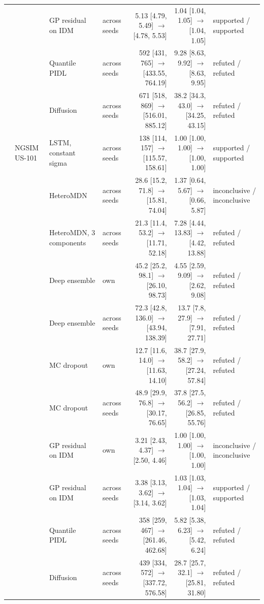 \begin{longtable}{llllrrl}
 &  & GP residual on IDM & across seeds & 5.13 [4.79, 5.49] $\rightarrow$ [4.78, 5.53] & 1.04 [1.04, 1.05] $\rightarrow$ [1.04, 1.05] & supported / supported \\
 &  & Quantile PIDL & across seeds & 592 [431, 765] $\rightarrow$ [433.55, 764.19] & 9.28 [8.63, 9.92] $\rightarrow$ [8.63, 9.95] & refuted / refuted \\
 &  & Diffusion & across seeds & 671 [518, 869] $\rightarrow$ [516.01, 885.12] & 38.2 [34.3, 43.0] $\rightarrow$ [34.25, 43.15] & refuted / refuted \\
\midrule
 & NGSIM US-101 & LSTM, constant sigma & across seeds & 138 [114, 157] $\rightarrow$ [115.57, 158.61] & 1.00 [1.00, 1.00] $\rightarrow$ [1.00, 1.00] & supported / supported \\
 &  & HeteroMDN & across seeds & 28.6 [15.2, 71.8] $\rightarrow$ [15.81, 74.04] & 1.37 [0.64, 5.67] $\rightarrow$ [0.66, 5.87] & inconclusive / inconclusive \\
 &  & HeteroMDN, 3 components & across seeds & 21.3 [11.4, 53.2] $\rightarrow$ [11.71, 52.18] & 7.28 [4.44, 13.83] $\rightarrow$ [4.42, 13.88] & refuted / refuted \\
 &  & Deep ensemble & own & 45.2 [25.2, 98.1] $\rightarrow$ [26.10, 98.73] & 4.55 [2.59, 9.09] $\rightarrow$ [2.62, 9.08] & refuted / refuted \\
 &  & Deep ensemble & across seeds & 72.3 [42.8, 136.0] $\rightarrow$ [43.94, 138.39] & 13.7 [7.8, 27.9] $\rightarrow$ [7.91, 27.71] & refuted / refuted \\
 &  & MC dropout & own & 12.7 [11.6, 14.0] $\rightarrow$ [11.63, 14.10] & 38.7 [27.9, 58.2] $\rightarrow$ [27.24, 57.84] & refuted / refuted \\
 &  & MC dropout & across seeds & 48.9 [29.9, 76.8] $\rightarrow$ [30.17, 76.65] & 37.8 [27.5, 56.2] $\rightarrow$ [26.85, 55.76] & refuted / refuted \\
 &  & GP residual on IDM & own & 3.21 [2.43, 4.37] $\rightarrow$ [2.50, 4.46] & 1.00 [1.00, 1.00] $\rightarrow$ [1.00, 1.00] & inconclusive / inconclusive \\
 &  & GP residual on IDM & across seeds & 3.38 [3.13, 3.62] $\rightarrow$ [3.14, 3.62] & 1.03 [1.03, 1.04] $\rightarrow$ [1.03, 1.04] & supported / supported \\
 &  & Quantile PIDL & across seeds & 358 [259, 467] $\rightarrow$ [261.46, 462.68] & 5.82 [5.38, 6.23] $\rightarrow$ [5.42, 6.24] & refuted / refuted \\
 &  & Diffusion & across seeds & 439 [334, 572] $\rightarrow$ [337.72, 576.58] & 28.7 [25.7, 32.1] $\rightarrow$ [25.81, 31.80] & refuted / refuted \\

\end{longtable}
